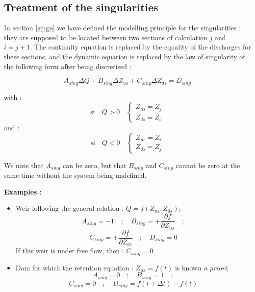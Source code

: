 \subsection{Treatment of the singularities} \label{TS}

In section \ref{singu} we have defined the modelling principle for the singularities : they are supposed to be located between two sections of calculation $j$ and $i = j + 1$. The continuity equation is replaced by the equality of the discharges for these sections, and the dynamic equation is replaced by the law of singularity of the following form after being discretised :

\begin{equation}
  A_{sing} \Delta Q + B_{sing} \Delta Z_{us} + C_{sing} \Delta Z_{ds} = D_{sing}
\end{equation}

with :
\begin{equation}
 \mbox{si} \quad Q > 0 \quad \left \lbrace
     \begin{array}{l}
      Z_{us} = Z_j\\
      Z_{ds} = Z_i
     \end{array}
    \right.
\end{equation}
and :
\begin{equation}
 \mbox{si} \quad Q < 0 \quad \left \lbrace
     \begin{array}{l}
      Z_{us} = Z_i\\
      Z_{ds} = Z_j
     \end{array}
    \right.
\end{equation}

We note that $A_{sing}$ can be zero, but that $B_{sing}$ and $C_{sing}$ cannot be zero at the same time without the system being undefined.

\textbf{Examples :}
\begin{itemize}
 \item Weir following the general relation : $Q = f(Z_{us},Z_{ds})$;
 $$ A_{sing} = -1 \quad;\quad B_{sing} = + \frac{\partial f}{\partial Z_{us}} \quad;$$
 $$ C_{sing} = + \frac{\partial f}{\partial Z_{ds}} \quad;\quad D_{sing} = 0 $$
 \quad If this weir is under free flow, then : $C_{sing} = 0$
 \item Dam for which the retention equation : $Z_{us} = f(t)$ is known \textit{a priori};
 $$ A_{sing} = 0 \quad;\quad B_{sing} = 1 \quad;$$
 $$ C_{sing} = 0 \quad;\quad D_{sing} = f(t+\Delta t)-f(t)$$
\end{itemize}

